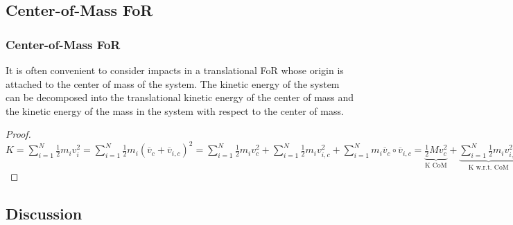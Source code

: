 \subsection{Center-of-Mass FoR}
\begin{frame}\label{CoMFoRKineticEnergy}
\frametitle{Center-of-Mass FoR}
It is often convenient to consider impacts in a \alert{translational} FoR whose origin is attached to the \alert{center of mass} of the system. The kinetic energy of the system can be decomposed into the \alert{translational kinetic energy} of the \alert{center of mass} and the kinetic energy of the mass in the system with respect to the center of mass.
\begin{proof}
$K=\sum_{i=1}^{N}\frac{1}{2}m_i v_i^2=\sum_{i=1}^{N}\frac{1}{2}m_i(\overline{v}_c+\overline{v}_{i,c})^2=\sum_{i=1}^{N}\frac{1}{2}m_i v_c^2+\sum_{i=1}^{N}\frac{1}{2}m_iv_{i,c}^2+\sum_{i=1}^N m_i\overline v_c\circ \overline v_{i,c}=\underbrace{\frac{1}{2}Mv_c^2}_{\text{K CoM}}+\underbrace{\sum_{i=1}^{N}\frac{1}{2}m_i v_{i,c}^2}_{\text{K w.r.t. CoM}}+\underbrace{\overline{v_c}\circ\sum_{i=1}^{N}m_{i}\overline{v}_{i,c}}_{\text{Zero}}$
\end{proof}
\end{frame}
\subsection{Discussion}

